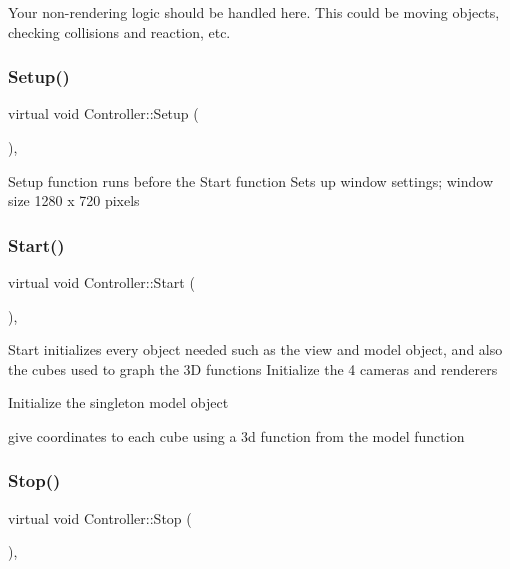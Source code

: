 Your non-\/rendering logic should be handled here. This could be moving objects, checking collisions and reaction, etc. \mbox{\label{class_controller_a3ca9504f8805a9b8cd6084058158a461}} 
\subsubsection{\texorpdfstring{Setup()}{Setup()}}
{\footnotesize\ttfamily virtual void Controller\+::\+Setup (\begin{DoxyParamCaption}{ }\end{DoxyParamCaption})\hspace{0.3cm}{\ttfamily [inline]}, {\ttfamily [virtual]}}

Setup function runs before the Start function Sets up window settings; window size 1280 x 720 pixels \mbox{\label{class_controller_a27d79f6e08039a2cfb5da6b4d4da6aaf}} 
\subsubsection{\texorpdfstring{Start()}{Start()}}
{\footnotesize\ttfamily virtual void Controller\+::\+Start (\begin{DoxyParamCaption}{ }\end{DoxyParamCaption})\hspace{0.3cm}{\ttfamily [inline]}, {\ttfamily [virtual]}}

Start initializes every object needed such as the view and model object, and also the cubes used to graph the 3D functions Initialize the 4 cameras and renderers

Initialize the singleton model object

give coordinates to each cube using a 3d function from the model function\mbox{\label{class_controller_ad026d93eec698b8333bf9ad138f36007}} 
\subsubsection{\texorpdfstring{Stop()}{Stop()}}
{\footnotesize\ttfamily virtual void Controller\+::\+Stop (\begin{DoxyParamCaption}{ }\end{DoxyParamCaption})\hspace{0.3cm}{\ttfamily [inline]}, {\ttfamily [virtual]}}

